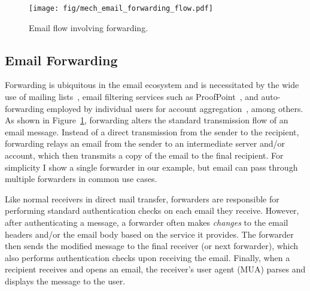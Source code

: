 \begin{figure}[t]
\centerline{\texttt{[image: fig/mech\_email\_forwarding\_flow.pdf]}}
\caption[Email Flow Involving Forwarding]{Email flow involving forwarding.}
\label{fig:email_forwarding_flow}
  \vspace*{-0.1in}
\end{figure}


\subsection{Email Forwarding}
\label{sec:background:fwd:overview}
Forwarding is ubiquitous in the email ecosystem and is necessitated by
the wide use of mailing lists~\cite{Electron8:online}, email filtering
services such as ProofPoint~\cite{SecureEm78:online}, and
auto-forwarding employed by individual users for account
aggregation~\cite{TheBestW9:online}, among others.  As shown in
Figure~\ref{fig:email_forwarding_flow}, forwarding alters the standard
transmission flow of an email message.  Instead of a direct
transmission from the sender to the recipient, forwarding relays an
email from the sender to an intermediate server and/or account, which
then transmits a copy of the email to the final recipient.
For simplicity I show a single forwarder in our example, but email can pass through multiple forwarders in common use cases. %

Like normal receivers in direct mail transfer,
forwarders are responsible for performing standard authentication checks on each email they receive. %
However, after authenticating a message,
a forwarder often makes \emph{changes} to the email headers and/or the
email body based on the service it provides.
The forwarder then sends the modified message to the final receiver (or next forwarder), which also performs authentication checks upon receiving the email.
Finally, when a recipient receives and opens an email, the receiver's user agent (MUA) parses and displays the message to the user.

